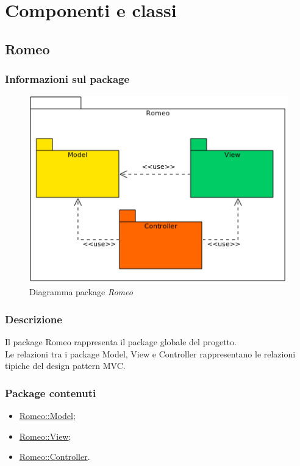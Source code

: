 \section{Componenti e classi}
\label{componenti_classi}
\subsection{Romeo}
\label{pack_romeo}
	\subsubsection{Informazioni sul package}
	\label{info_romeo}
	\begin{figure}[!h]
		\centering
		\includegraphics[scale=0.7]{./Content/Immagini/Romeo.png}
		\caption{Diagramma package \textsl{Romeo}}
		\label{MVC_Romeo}
	\end{figure}
	\subsubsection{Descrizione}
	\label{romeo_desc}
	Il package\glossario{} Romeo rappresenta il package\glossario{} globale del progetto.
	\\Le relazioni tra i package\glossario{} Model, View e Controller rappresentano le relazioni tipiche del design pattern\glossario{} MVC\glossario{}.
	\subsubsection{Package contenuti}
	\label{Romeo_contents}
	\begin{itemize}
		\item \hyperref[romeo::model]{Romeo::Model};
		\item \hyperref[romeo::view]{Romeo::View};
		\item \hyperref[romeo::controller]{Romeo::Controller}.
	\end{itemize}
